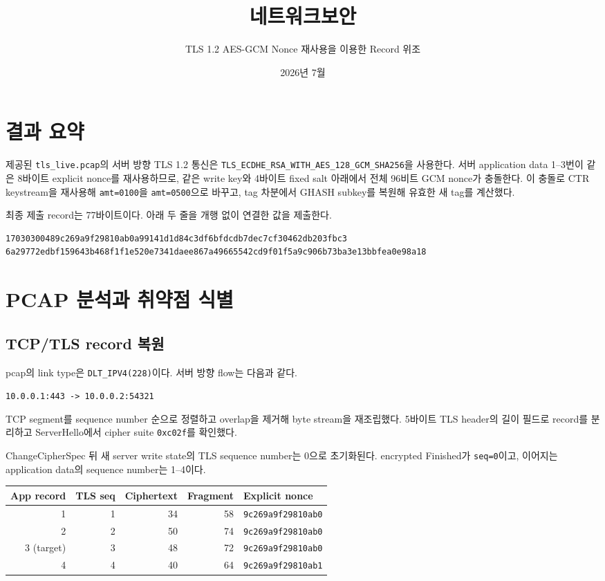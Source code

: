 \documentclass[10pt,a4paper]{article}
\title{네트워크보안}
\author{TLS 1.2 AES-GCM Nonce 재사용을 이용한 Record 위조}
\date{2026년 7월}
\begin{document}
\maketitle

\section*{결과 요약}

제공된 \texttt{tls\_live.pcap}의 서버 방향 TLS 1.2 통신은
\texttt{TLS\_ECDHE\_RSA\_WITH\_AES\_128\_GCM\_SHA256}을 사용한다.
서버 application data 1--3번이 같은 8바이트 explicit nonce를
재사용하므로, 같은 write key와 4바이트 fixed salt 아래에서 전체
96비트 GCM nonce가 충돌한다. 이 충돌로 CTR keystream을 재사용해
\texttt{amt=0100}을 \texttt{amt=0500}으로 바꾸고, tag 차분에서
GHASH subkey를 복원해 유효한 새 tag를 계산했다.

최종 제출 record는 77바이트이다. 아래 두 줄을 개행 없이 연결한 값을 제출한다.

\begin{lstlisting}
17030300489c269a9f29810ab0a99141d1d84c3df6bfdcdb7dec7cf30462db203fbc3
6a29772edbf159643b468f1f1e520e7341daee867a49665542cd9f01f5a9c906b73ba3e13bbfea0e98a18
\end{lstlisting}

\section{PCAP 분석과 취약점 식별}

\subsection{TCP/TLS record 복원}

pcap의 link type은 \texttt{DLT\_IPV4(228)}이다. 서버 방향 flow는
다음과 같다.

\begin{center}
\texttt{10.0.0.1:443 -> 10.0.0.2:54321}
\end{center}

TCP segment를 sequence number 순으로 정렬하고 overlap을 제거해 byte stream을 재조립했다.
5바이트 TLS header의 길이 필드로 record를 분리하고 ServerHello에서
cipher suite \texttt{0xc02f}를 확인했다.

ChangeCipherSpec 뒤 새 server write state의 TLS sequence number는
0으로 초기화된다. encrypted Finished가 \texttt{seq=0}이고, 이어지는
application data의 sequence number는 1--4이다.

\begin{center}
\small
\begin{tabular}{rrrrl}
\toprule
App record & TLS seq & Ciphertext & Fragment & Explicit nonce \\
\midrule
1 & 1 & 34 & 58 & \texttt{9c269a9f29810ab0} \\
2 & 2 & 50 & 74 & \texttt{9c269a9f29810ab0} \\
3 (target) & 3 & 48 & 72 & \texttt{9c269a9f29810ab0} \\
4 & 4 & 40 & 64 & \texttt{9c269a9f29810ab1} \\
\bottomrule
\end{tabular}
\end{center}
\end{document}
